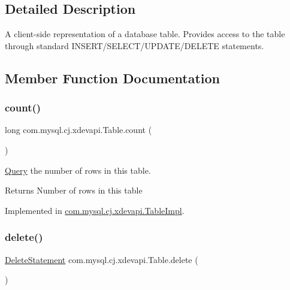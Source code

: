 \subsection{Detailed Description}
A client-\/side representation of a database table. Provides access to the table through standard I\+N\+S\+E\+R\+T/\+S\+E\+L\+E\+C\+T/\+U\+P\+D\+A\+T\+E/\+D\+E\+L\+E\+TE statements. 

\subsection{Member Function Documentation}
\mbox{\label{interfacecom_1_1mysql_1_1cj_1_1xdevapi_1_1_table_a4f0524bd76d54d6b053187ea09ab2956}} 
\subsubsection{\texorpdfstring{count()}{count()}}
{\footnotesize\ttfamily long com.\+mysql.\+cj.\+xdevapi.\+Table.\+count (\begin{DoxyParamCaption}{ }\end{DoxyParamCaption})}

\mbox{\hyperlink{interfacecom_1_1mysql_1_1cj_1_1_query}{Query}} the number of rows in this table.

\begin{DoxyReturn}{Returns}
Number of rows in this table 
\end{DoxyReturn}


Implemented in \mbox{\hyperlink{classcom_1_1mysql_1_1cj_1_1xdevapi_1_1_table_impl_a855ae05acfd531e69738a8a88824fe8c}{com.\+mysql.\+cj.\+xdevapi.\+Table\+Impl}}.

\mbox{\label{interfacecom_1_1mysql_1_1cj_1_1xdevapi_1_1_table_a52be4284a88e0a4f243580be570018e2}} 
\subsubsection{\texorpdfstring{delete()}{delete()}}
{\footnotesize\ttfamily \mbox{\hyperlink{interfacecom_1_1mysql_1_1cj_1_1xdevapi_1_1_delete_statement}{Delete\+Statement}} com.\+mysql.\+cj.\+xdevapi.\+Table.\+delete (\begin{DoxyParamCaption}{ }\end{DoxyParamCaption})}

